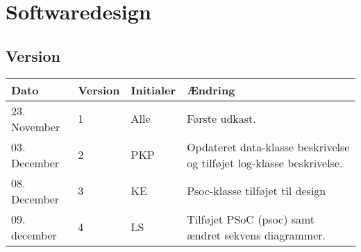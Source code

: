 \chapter{Softwaredesign}

\section*{Version}
\begin{table}[h]
	\centering
	\begin{tabularx}{\textwidth - 2cm}{|l|l|l|X|}
	\hline
	Dato			& Version		& Initialer 	& Ændring																	\\ \hline
	23. November	& 1 			& Alle			& Første udkast. 															\\ \hline
	03. December 	& 2 			& PKP			& Opdateret data-klasse beskrivelse og tilføjet log-klasse beskrivelse. 	\\ \hline
	08. December 	& 3 			& KE			& Psoc-klasse tilføjet til design 											\\ \hline
	09. december 	& 4 			& LS			& Tilføjet PSoC (psoc) samt ændret sekvens diagrammer.						\\ \hline
\end{tabularx}
\end{table}
\clearpage






